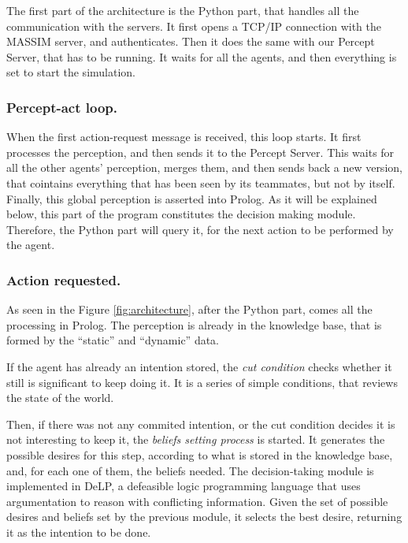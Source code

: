 \documentclass{llncs2e/llncs}
\begin{document}
    The first part of the architecture is the Python part, that handles all the 
    communication with the servers. It first opens a TCP/IP connection with the 
    MASSIM server, and authenticates. Then it does the same with our Percept 
    Server, that has to be running. It waits for all the agents, and then 
    everything is set to start the simulation.

\subsubsection{Percept-act loop.}

    When the first action-request message is received, this loop starts. It 
    first processes the perception, and then sends it to the Percept Server. 
    This waits for all the other agents' perception, merges them, and then sends 
    back a new version, that cointains everything that has been seen by its
    teammates, but not by itself. Finally, this global perception is asserted 
    into Prolog. 
    As it will be explained below, this part of the program constitutes the 
    decision making module. Therefore, the Python part will query it, for the
    next action to be performed by the agent.
    
\subsubsection{Action requested.}

    As seen in the Figure \ref{fig:architecture}, after the Python part, comes 
    all the processing in Prolog. The perception is already in the knowledge 
    base, that is formed by the ``static'' and ``dynamic'' data. 

    If the agent has already an intention stored, the \textit{cut condition} 
    checks whether it still is significant to keep doing it. It is a series of 
    simple conditions, that reviews the state of the world.

    Then, if there was not any commited intention, or the cut condition decides 
    it is not interesting to keep it, the \textit{beliefs setting process} is 
    started. It generates the possible desires for this step, according to what 
    is stored in the knowledge base, and, for each one of them, the beliefs 
    needed. 
    The decision-taking module is implemented in DeLP, a defeasible logic 
    programming language that uses argumentation to reason with conflicting
    information. 
    Given the set of possible 
    desires and beliefs set by the previous module, it selects the best desire, 
    returning it as the intention to be done.
\end{document}

